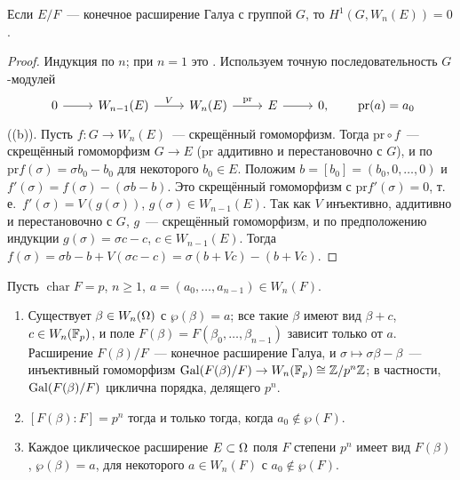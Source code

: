 \begin{lemma}[5.32r]
Если $E/F$~--- конечное расширение Галуа с группой $G$, то $H^1(G,W_n(E))=0$.
\end{lemma}

\begin{proof}
Индукция по $n$; при $n=1$ это . Используем точную последовательность $G$-модулей
\[
\begin{tikzcd}
0\arrow[r] & W_{n-1}(E)\arrow[r,"V"] & W_n(E)\arrow[r,"\mathrm{pr}"] & E\arrow[r] & 0,
\end{tikzcd}\qquad\mathrm{pr}(a)=a_0
\]
((b)). Пусть $f\colon G\to W_n(E)$~--- скрещённый гомоморфизм. Тогда $\mathrm{pr}\circ f$~--- скрещённый гомоморфизм
$G\to E$ ($\mathrm{pr}$ аддитивно и перестановочно с $G$), и по  $\mathrm{pr}f(\sigma)=\sigma b_0-b_0$ для некоторого
$b_0\in E$. Положим $b=[b_0]=(b_0,0,\dots,0)$ и $f'(\sigma)=f(\sigma)-(\sigma b-b)$. Это скрещённый гомоморфизм с
$\mathrm{pr}f'(\sigma)=0$, т.\,е.\ $f'(\sigma)=V(g(\sigma))$, $g(\sigma)\in W_{n-1}(E)$. Так как $V$ инъективно, аддитивно и
перестановочно с $G$, $g$~--- скрещённый гомоморфизм, и по предположению индукции $g(\sigma)=\sigma c-c$, $c\in W_{n-1}(E)$.
Тогда $f(\sigma)=\sigma b-b+V(\sigma c-c)=\sigma(b+Vc)-(b+Vc)$.
\end{proof}

\begin{theorem}
Пусть $\operatorname{char}F=p$, $n\ge1$, $a=(a_0,\dots,a_{n-1})\in W_n(F)$.
\begin{enumerate}[label=\textup{(\alph*)}]
\item Существует $\beta\in W_n(\Omega)$ с $\wp(\beta)=a$; все такие $\beta$ имеют вид $\beta+c$, $c\in W_n(\mathbb F_p)$, и поле
$F(\beta)=F(\beta_0,\dots,\beta_{n-1})$ зависит только от $a$. Расширение $F(\beta)/F$~--- конечное расширение Галуа, и
$\sigma\mapsto\sigma\beta-\beta$~--- инъективный гомоморфизм $\operatorname{Gal}(F(\beta)/F)\to W_n(\mathbb F_p)\cong\mathbb Z/p^n\mathbb Z$; в частности,
$\operatorname{Gal}(F(\beta)/F)$ циклична порядка, делящего $p^n$.
\item $[F(\beta):F]=p^n$ тогда и только тогда, когда $a_0\notin\wp(F)$.
\item Каждое циклическое расширение $E\subset\Omega$ поля $F$ степени $p^n$ имеет вид $F(\beta)$, $\wp(\beta)=a$, для некоторого
$a\in W_n(F)$ с $a_0\notin\wp(F)$.
\end{enumerate}
\end{theorem}

